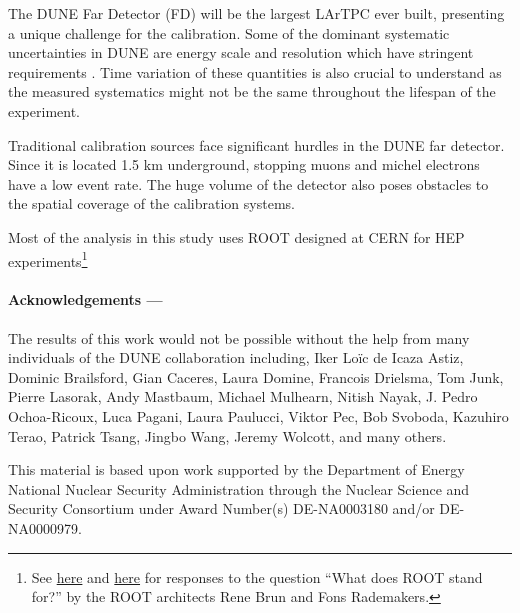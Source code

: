 \documentclass[8pt]{refart}
\begin{document}

The DUNE Far Detector (FD) will be the largest LArTPC ever built, presenting a unique challenge for the calibration. Some of the dominant systematic uncertainties in DUNE are energy scale and resolution which have stringent requirements \cite{DUNE:2020ypp}. Time variation of these quantities is also crucial to understand as the measured systematics might not be the same throughout the lifespan of the experiment.

Traditional calibration sources face significant hurdles in the DUNE far detector. Since it is located 1.5 km underground, stopping muons and michel electrons have a low event rate. The huge volume of the detector also poses obstacles to the spatial coverage of the calibration systems.

Most of the analysis in this study uses ROOT designed at CERN for HEP experiments\footnote{See \href{https://root.cern.ch/root/roottalk/roottalk98/0718.html}{here} and \href{https://root.cern.ch/root/roottalk/roottalk98/0715.html}{here} for responses to the question ``What does ROOT stand for?'' by the ROOT architects Rene Brun and Fons Rademakers.}

\paragraph{Acknowledgements ---}The results of this work would not be possible without the help from many individuals of the DUNE collaboration including, Iker Loïc de Icaza Astiz, Dominic Brailsford, Gian Caceres, Laura Domine, Francois Drielsma, Tom Junk, Pierre Lasorak, Andy Mastbaum, Michael Mulhearn, Nitish Nayak, J. Pedro Ochoa-Ricoux, Luca Pagani, Laura Paulucci, Viktor Pec, Bob Svoboda, Kazuhiro Terao, Patrick Tsang, Jingbo Wang, Jeremy Wolcott, and many others.  

This material is based upon work supported by the Department of Energy National Nuclear Security Administration through the Nuclear Science and
Security Consortium under Award Number(s) DE-NA0003180 and/or DE-NA0000979.
\end{document}
